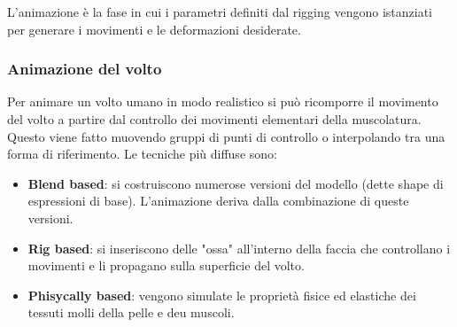\documentclass[a4paper]{article}
\begin{document}
\vspace{1em}
\noindent
L'animazione è la fase in cui i parametri definiti dal rigging vengono istanziati per
generare i movimenti e le deformazioni desiderate.

\subsubsection{Animazione del volto}
Per animare un volto umano in modo realistico si può ricomporre il movimento del volto a
partire dal controllo dei movimenti elementari della muscolatura. Questo viene fatto
muovendo gruppi di punti di controllo o interpolando tra una forma di riferimento.
Le tecniche più diffuse sono:
\begin{itemize}
  \item \textbf{Blend based}: si costruiscono numerose versioni del modello
    (dette shape di espressioni di base). L'animazione deriva dalla combinazione
    di queste versioni.
  \item \textbf{Rig based}: si inseriscono delle "ossa" all'interno della faccia che
    controllano i movimenti e li propagano sulla superficie del volto.
  \item \textbf{Phisycally based}: vengono simulate le proprietà fisice ed elastiche dei tessuti
    molli della pelle e deu muscoli.
\end{itemize}
\end{document}
